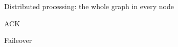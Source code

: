 
\label  {fs-implementation-section}

Distributed processing: the whole graph in every node

ACK

Faileover



